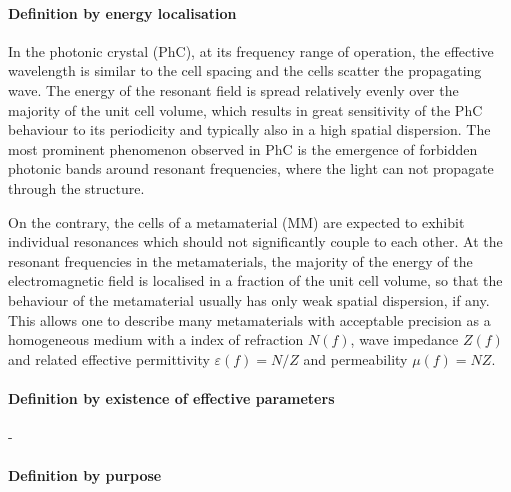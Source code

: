 
\paragraph{Definition by energy localisation}


In the photonic crystal (PhC), at its frequency range of operation, the effective wavelength is similar to the cell spacing and the cells scatter the propagating wave.
The energy of the resonant field is spread relatively evenly over the majority of the unit cell volume, which results in great sensitivity of the PhC behaviour to its periodicity and typically also in a high spatial dispersion. The most prominent phenomenon observed in PhC is the emergence of forbidden photonic bands around resonant frequencies, where the light can not propagate through the structure. 

On the contrary, the cells of a metamaterial (MM) are expected to exhibit individual resonances which should not significantly couple to each other. 
At the resonant frequencies in the metamaterials, the majority of the energy of the electromagnetic field is localised in a fraction of the unit cell volume, so that the behaviour of the metamaterial usually has only weak spatial dispersion, if any. This allows one to describe many metamaterials with acceptable precision as a homogeneous medium with a index of refraction $N(f)$, wave impedance $Z(f)$ and related effective permittivity $\varepsilon(f)=N/Z$ and permeability $\mu(f)=NZ$. 



\paragraph{Definition by existence of effective parameters}
-



\paragraph{Definition by purpose}

